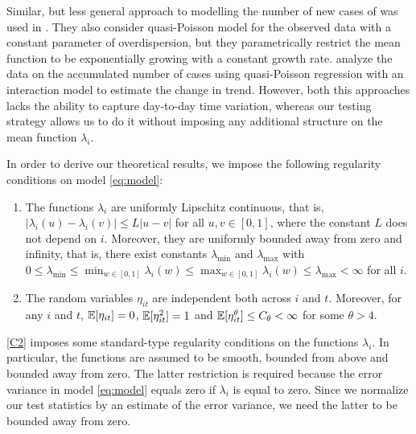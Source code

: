 \documentclass[a4paper,12pt]{article}
\numberwithin{equation}{section}
\begin{document}
Similar, but less general approach to modelling the number of new cases of  was used in \cite{Pellis2020}. They also consider quasi-Poisson model for the observed data with a constant parameter of overdispersion, but they parametrically restrict the mean function to be exponentially growing with a constant growth rate. \cite{Tobias2020} analyze the data on the accumulated number of cases using quasi-Poisson regression with an interaction model to estimate the change in trend. However, both this approaches lacks the ability to capture day-to-day time variation, whereas our testing strategy allows us to do it without imposing any additional structure on the mean function $\lambda_i$.
 
In order to derive our theoretical results, we impose the following regularity conditions on model \eqref{eq:model}:
\begin{enumerate}[label=(C\arabic*),leftmargin=1.0cm]
\item \label{C2} The functions $\lambda_i$ are uniformly Lipschitz continuous, that is, $|\lambda_i(u) - \lambda_i(v)| \le L |u-v|$ for all $u, v \in [0,1]$, where the constant $L$ does not depend on $i$. Moreover, they are uniformly bounded away from zero and infinity, that is, there exist constants $\lambda_{\min}$ and $\lambda_{\max}$ with $0 \le \lambda_{\min} \le \min_{w \in [0,1]} \lambda_i(w) \le \max_{w \in [0,1]} \lambda_i(w) \le \lambda_{\max} < \infty$ for all $i$. 
\item \label{C1} The random variables $\eta_{it}$ are independent both across $i$ and $t$. Moreover, for any $i$ and $t$, $\mathbb{E}[\eta_{it}] = 0$, $\mathbb{E}[\eta_{it}^2] = 1$ and $\mathbb{E}[\eta_{it}^\theta] \le C_\theta < \infty$ for some $\theta > 4$. 
\end{enumerate}
\ref{C2} imposes some standard-type regularity conditions on the functions $\lambda_i$. In particular, the functions are assumed to be smooth, bounded from above and bounded away from zero. The latter restriction is required because the error variance in model \eqref{eq:model} equals zero if $\lambda_i$ is equal to zero. Since we normalize our test statistics by an estimate of the error variance, we need the latter to be bounded away from zero. 
\end{document}
